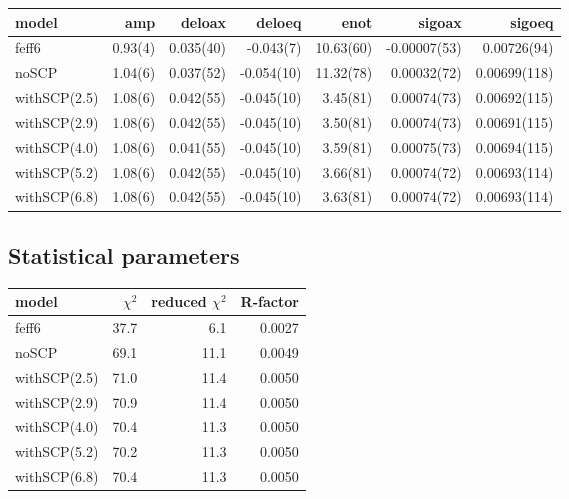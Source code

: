 \documentclass[11pt]{article}
\begin{document}
\begin{center}
  \footnotesize
  \begin{tabular}{lrrrrrr}
    model & amp & deloax & deloeq & enot & sigoax & sigoeq\\
    \hline
    feff6        & 0.93(4) & 0.035(40) & -0.043(7)  & 10.63(60) & -0.00007(53) & 0.00726(94)\\
    noSCP        & 1.04(6) & 0.037(52) & -0.054(10) & 11.32(78) &  0.00032(72) & 0.00699(118)\\
    withSCP(2.5) & 1.08(6) & 0.042(55) & -0.045(10) &  3.45(81) &  0.00074(73) & 0.00692(115)\\
    withSCP(2.9) & 1.08(6) & 0.042(55) & -0.045(10) &  3.50(81) &  0.00074(73) & 0.00691(115)\\
    withSCP(4.0) & 1.08(6) & 0.041(55) & -0.045(10) &  3.59(81) &  0.00075(73) & 0.00694(115)\\
    withSCP(5.2) & 1.08(6) & 0.042(55) & -0.045(10) &  3.66(81) &  0.00074(72) & 0.00693(114)\\
    withSCP(6.8) & 1.08(6) & 0.042(55) & -0.045(10) &  3.63(81) &  0.00074(72) & 0.00693(114)\\
  \end{tabular}
\end{center}

\subsection{Statistical parameters}
\label{sec:orgheadline39}

\begin{center}
  \begin{tabular}{lrrr}
    model & $\chi^2$ & reduced $\chi^2$ & R-factor\\
    \hline
    feff6        & 37.7 &  6.1 & 0.0027\\
    noSCP        & 69.1 & 11.1 & 0.0049\\
    withSCP(2.5) & 71.0 & 11.4 & 0.0050\\
    withSCP(2.9) & 70.9 & 11.4 & 0.0050\\
    withSCP(4.0) & 70.4 & 11.3 & 0.0050\\
    withSCP(5.2) & 70.2 & 11.3 & 0.0050\\
    withSCP(6.8) & 70.4 & 11.3 & 0.0050\\
  \end{tabular}
\end{center}

\end{document}
